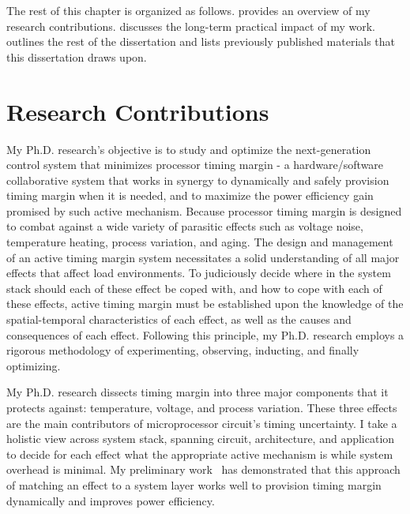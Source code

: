 The rest of this chapter is organized as follows.  provides an overview of my research contributions.  discusses the long-term practical impact of my work.  outlines the rest of the dissertation and  lists previously published materials that this dissertation draws upon.

\section{Research Contributions}
\label{sec:intro:work}

My Ph.D. research's objective is to study and optimize the next-generation control system that minimizes processor timing margin - a hardware/software collaborative system that works in synergy to dynamically and safely provision timing margin when it is needed, and to maximize the power efficiency gain promised by such active mechanism. Because processor timing margin is designed to combat against a wide variety of parasitic effects such as voltage noise, temperature heating, process variation, and aging. The design and management of an active timing margin system necessitates a solid understanding of all major effects that affect load environments. To judiciously decide where in the system stack should each of these effect be coped with, and how to cope with each of these effects, active timing margin must be established upon the knowledge of the spatial-temporal characteristics of each effect, as well as the causes and consequences of each effect. Following this principle, my Ph.D. research employs a rigorous methodology of experimenting, observing, inducting, and finally optimizing. 

My Ph.D. research dissects timing margin into three major components that it protects against: temperature, voltage, and process variation. These three effects are the main contributors of microprocessor circuit's timing uncertainty. I take a holistic view across system stack, spanning circuit, architecture, and application to decide for each effect what the appropriate active mechanism is while system overhead is minimal. My preliminary work~\cite{leng2015gpu,zu2015adaptive,zu2016tistate} has demonstrated that this approach of matching an effect to a system layer works well to provision timing margin dynamically and improves power efficiency.

